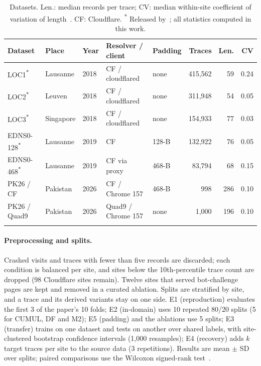 \documentclass[pdflatex,sn-mathphys-num]{sn-jnl}
\newcommand{\pub}{\textsuperscript{*}}
\begin{document}
\begin{table}[t]
\caption{Datasets. Len.: median records per trace; CV: median within-site coefficient of variation of length~\cite{jansen2026gtt23}. CF: Cloudflare. \pub{} Released by~\cite{siby2020}; all statistics computed in this work.}\label{tab:datasets}
\scriptsize\setlength{\tabcolsep}{3pt}
\begin{tabular*}{\textwidth}{@{\extracolsep\fill}lllllrrr@{}}
\toprule
Dataset & Place & Year & Resolver / client & Padding & Traces & Len. & CV \\
\midrule
LOC1\pub & Lausanne & 2018 & CF / cloudflared & none & 415,562 & 59 & 0.24 \\
LOC2\pub & Leuven & 2018 & CF / cloudflared & none & 311,948 & 54 & 0.05 \\
LOC3\pub & Singapore & 2018 & CF / cloudflared & none & 154,933 & 77 & 0.03 \\
EDNS0-128\pub & Lausanne & 2019 & CF & 128-B & 132,922 & 76 & 0.05 \\
EDNS0-468\pub & Lausanne & 2019 & CF via proxy & 468-B & 83,794 & 68 & 0.15 \\
PK26 / CF & Pakistan & 2026 & CF / Chrome 157 & 468-B & 998 & 286 & 0.10 \\
PK26 / Quad9 & Pakistan & 2026 & Quad9 / Chrome 157 & none & 1,000 & 196 & 0.10 \\
\botrule
\end{tabular*}
\end{table}

\paragraph{Preprocessing and splits.} Crashed visits and traces with fewer than five records are discarded; each condition is balanced per site, and sites below the 10th-percentile trace count are dropped (98 Cloudflare sites remain). Twelve sites that served bot-challenge pages are kept and removed in a curated ablation. Splits are stratified by site, and a trace and its derived variants stay on one side. E1 (reproduction) evaluates the first 3 of the paper's 10 folds; E2 (in-domain) uses 10 repeated 80/20 splits (5 for CUMUL, DF and M2); E5 (padding) and the ablations use 5 splits; E3 (transfer) trains on one dataset and tests on another over shared labels, with site-clustered bootstrap confidence intervals (1,000 resamples); E4 (recovery) adds $k$ target traces per site to the source data (3 repetitions). Results are mean $\pm$ SD over splits; paired comparisons use the Wilcoxon signed-rank test~\cite{wilcoxon1945}.
\end{document}
